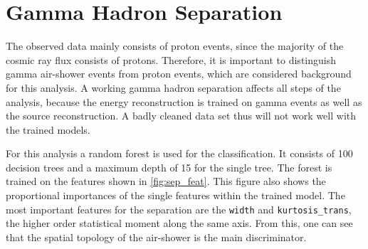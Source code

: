 \section{Gamma Hadron Separation}
%
The observed data mainly consists of proton events, since the majority of the
cosmic ray flux consists of protons. Therefore, it is important to distinguish
gamma air-shower events from proton events, which are considered background for
this analysis. A working gamma hadron separation affects all steps of the
analysis, because the energy reconstruction is trained on gamma events as well
as the source reconstruction. A badly cleaned data set thus will not work well
with the trained models.

For this analysis a random forest is used for the classification. It consists
of \num{100} decision trees and a maximum depth of \num{15} for the single
tree. The forest is trained on the features shown in \autoref{fig:sep_feat}.
This figure also shows the proportional importances of the single features
within the trained model. The most important features for the separation are
the \texttt{width} and \texttt{kurtosis\_trans}, the higher order statistical
moment along the same axis. From this, one can see that the spatial topology of
the air-shower is the main discriminator.

